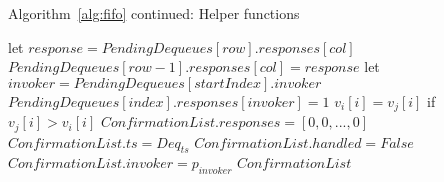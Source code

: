 \documentclass[a4paper,USenglish]{lipics-v2021} %
\begin{document}
\begin{algorithm}
  \caption{Algorithm~\ref{alg:fifo} continued: Helper functions}
  \begin{algorithmic}[1]
    
    \State let $response = PendingDequeues[row].responses[col]$ 
    \State $PendingDequeues[row-1].responses[col] = response$
    \EndIf
    \EndFor
    \EndFor
    \EndFunction
      \State let $invoker = PendingDequeues[startIndex].invoker$
      \State $PendingDequeues[index].responses[invoker] = 1$  
      \EndFor
    \EndFunction
      \State $v_i[i] = v_j[i]$ if $v_j[i] > v_i[i]$
      \EndFor
    \EndFunction
    \State $ConfirmationList.responses = [0,0,...,0]$ 
    \State $ConfirmationList.ts = Deq_{ts}$ 
    \State $ConfirmationList.handled = False$ 
    \State $ConfirmationList.invoker = p_{invoker}$ 
    \State \Return $ConfirmationList$
    \EndFunction
  \end{algorithmic}
\end{algorithm}


\end{document}
